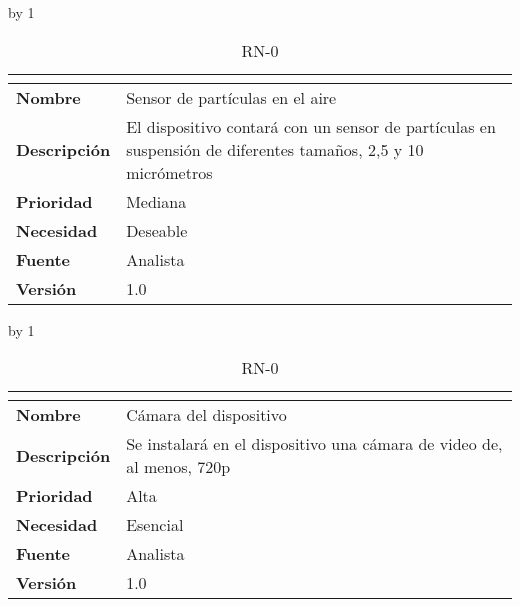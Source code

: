 \advance\rn by 1
\begin{table}[H]
	\caption{RN-0\number\rn}
	\begin{tabular}{|l|p{}|}
		\hline
		\multicolumn{2}{|c|}{\cellcolor[HTML]{BFBFBF}{\color[HTML]{000000} \textbf{RN-0\number\rn}}} \\ \hline
		\textbf{Nombre}      & Sensor de partículas en el aire                                                                              \\ \hline
		\textbf{Descripción} & El dispositivo contará con un sensor de partículas en suspensión de diferentes tamaños, 2,5 y 10 micrómetros \\ \hline
		\textbf{Prioridad}   & Mediana                                                                                                      \\ \hline
		\textbf{Necesidad}   & Deseable                                                                                                     \\ \hline
		\textbf{Fuente}      & Analista                                                                                                     \\ \hline
		\textbf{Versión}     & 1.0                                                                                                          \\ \hline
	\end{tabular}
\end{table}
\advance\rn by 1
\begin{table}[H]
	\caption{RN-0\number\rn}
	\begin{tabular}{|l|p{}|}
		\hline
		\multicolumn{2}{|c|}{\cellcolor[HTML]{BFBFBF}{\color[HTML]{000000} \textbf{RN-0\number\rn}}} \\ \hline
		\textbf{Nombre}      & Cámara del dispositivo                                                \\ \hline
		\textbf{Descripción} & Se instalará en el dispositivo una cámara de video de, al menos, 720p \\ \hline
		\textbf{Prioridad}   & Alta                                                                  \\ \hline
		\textbf{Necesidad}   & Esencial                                                              \\ \hline
		\textbf{Fuente}      & Analista                                                              \\ \hline
		\textbf{Versión}     & 1.0                                                                   \\ \hline
	\end{tabular}
\end{table}
